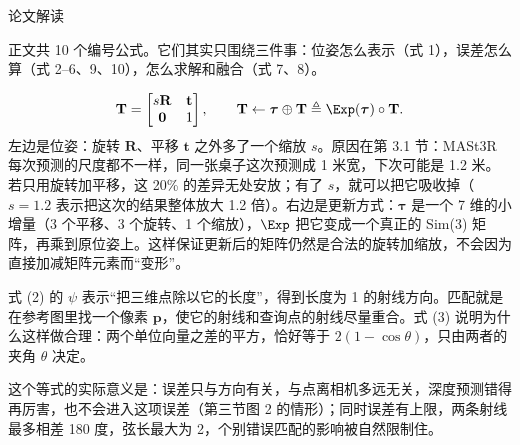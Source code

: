 \begin{interp}{论文解读}

正文共 10 个编号公式。它们其实只围绕三件事：位姿怎么表示（式 1），误差怎么算（式 2--6、9、10），怎么求解和融合（式 7、8）。


\[ \mathbf{T}=\begin{bmatrix}s\mathbf{R}&\mathbf{t}\\ \mathbf{0}&1\end{bmatrix},\qquad \mathbf{T}\leftarrow\boldsymbol{\tau}\oplus\mathbf{T}\triangleq\Exp(\boldsymbol{\tau})\circ\mathbf{T}. \]
左边是位姿：旋转 $\mathbf{R}$、平移 $\mathbf{t}$ 之外多了一个缩放 $s$。原因在第 3.1 节：MASt3R 每次预测的尺度都不一样，同一张桌子这次预测成 1 米宽，下次可能是 1.2 米。若只用旋转加平移，这 20\% 的差异无处安放；有了 $s$，就可以把它吸收掉（$s=1.2$ 表示把这次的结果整体放大 1.2 倍）。右边是更新方式：$\boldsymbol{\tau}$ 是一个 7 维的小增量（3 个平移、3 个旋转、1 个缩放），$\Exp$ 把它变成一个真正的 Sim(3) 矩阵，再乘到原位姿上。这样保证更新后的矩阵仍然是合法的旋转加缩放，不会因为直接加减矩阵元素而“变形”。


式 (2) 的 $\psi$ 表示“把三维点除以它的长度”，得到长度为 1 的射线方向。匹配就是在参考图里找一个像素 $\mathbf{p}$，使它的射线和查询点的射线尽量重合。式 (3) 说明为什么这样做合理：两个单位向量之差的平方，恰好等于 $2(1-\cos\theta)$，只由两者的夹角 $\theta$ 决定。

\begin{center}
\end{center}

这个等式的实际意义是：误差只与方向有关，与点离相机多远无关，深度预测错得再厉害，也不会进入这项误差（第三节图 2 的情形）；同时误差有上限，两条射线最多相差 180 度，弦长最大为 2，个别错误匹配的影响被自然限制住。


\end{interp}
